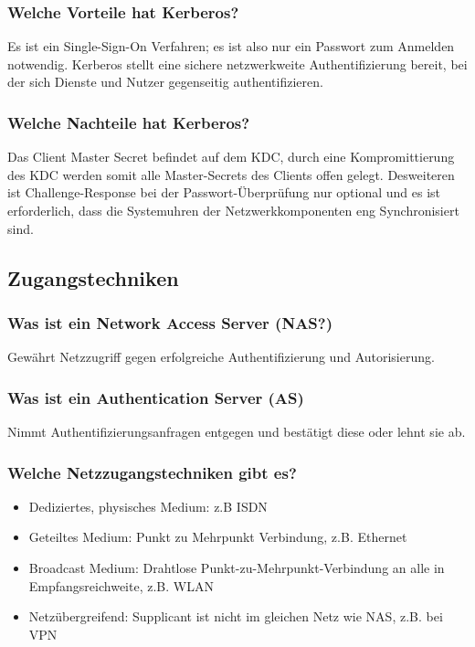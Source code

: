 	\subsubsection{Welche Vorteile hat Kerberos?}
	Es ist ein Single-Sign-On Verfahren; es ist also nur ein Passwort zum Anmelden notwendig. Kerberos stellt eine sichere netzwerkweite Authentifizierung  bereit, bei der sich Dienste und Nutzer gegenseitig authentifizieren. 

	\subsubsection{Welche Nachteile hat Kerberos?}
	Das Client Master Secret befindet auf dem KDC, durch eine Kompromittierung des KDC werden somit alle Master-Secrets des Clients offen gelegt. Desweiteren ist Challenge-Response bei der Passwort-Überprüfung nur optional und es ist erforderlich, dass die Systemuhren der Netzwerkkomponenten eng Synchronisiert sind.
	
	
		
		\subsection{Zugangstechniken}
		
		\subsubsection{Was ist ein Network Access Server (NAS?)}
		Gewährt Netzzugriff gegen erfolgreiche Authentifizierung und Autorisierung.
		
		\subsubsection{Was ist ein Authentication Server (AS)}
		Nimmt Authentifizierungsanfragen entgegen und bestätigt diese oder lehnt sie ab.
		
		\subsubsection{Welche Netzzugangstechniken gibt es?}
		\begin{itemize}
			\item Dediziertes, physisches Medium: z.B ISDN
			\item Geteiltes Medium: Punkt zu Mehrpunkt Verbindung, z.B. Ethernet
			\item Broadcast Medium: Drahtlose Punkt-zu-Mehrpunkt-Verbindung an alle in Empfangsreichweite, z.B. WLAN
			\item Netzübergreifend: Supplicant ist nicht im gleichen Netz wie NAS, z.B. bei VPN 
			
		\end{itemize}
